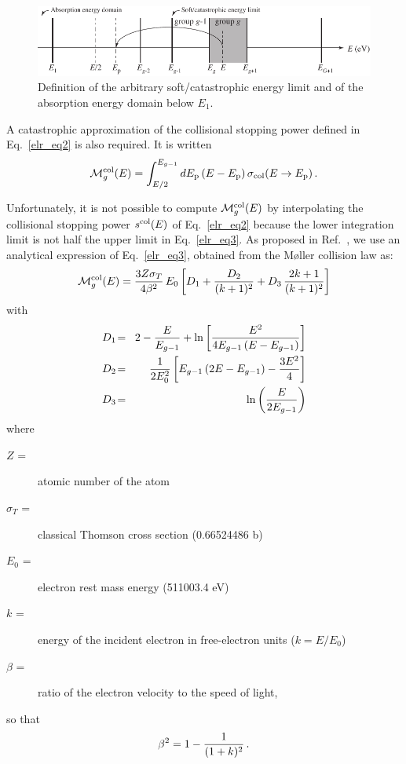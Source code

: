 \begin{figure}[h!]
\centering
\includegraphics[keepaspectratio, width=5.0in, angle=0]{figs/electr1ack}
\caption[Description of the multigroup discretization] {Definition of the
arbitrary soft/catastrophic energy limit and of the absorption energy domain
below $E_1$.}
\label{electr-fig1}
\end{figure}

A catastrophic approximation of the collisional stopping power defined
in Eq.~\ref{elr_eq2} is also required. It is written
  \begin{equation}
     {\cal M}^{\rm col}_g(E)=\int_{E/2}^{E_{g-1}} dE_{\rm p} \,
     (E - E_{\rm p}) \, \sigma_{\rm col}(E\rightarrow E_{\rm p}) \, .
  \label{elr_eq3}
  \end{equation}

Unfortunately, it is not possible to compute ${\cal M}^{\rm col}_g(E)$ by
interpolating the collisional stopping power $s^{\rm col}(E)$ of
Eq.~\ref{elr_eq2} because the lower integration limit is not half the upper
limit in Eq.~\ref{elr_eq3}. As proposed in Ref.~\cite{CEPXS}, we use an
analytical expression of Eq.~\ref{elr_eq3}, obtained from the M\o{}ller
collision law as:
  \begin{equation}
    {\cal M}^{\rm col}_g(E) = {3Z\sigma_T \over 4\beta^2}\, E_0
    \left[ D_1 + {D_2 \over (k+1)^2} + D_3 \, {2k+1 \over (k+1)^2} \right]
  \label{elr_eq4}
  \end{equation}
\noindent with
\vspace{-0.6cm}
  \begin{eqnarray}
  D_1\negthinspace &=& \negthinspace
  2-{E\over E_{g-1}}+\ln\left[{E^2\over 4E_{g-1}\left(E-E_{g-1}\right)}
  \right] \\
  D_2\negthinspace &=& {1\over 2E_0^2}\left[E_{g-1}\left(2E-E_{g-1}\right)
  - {3E^2\over 4}\right] \\
  D_3\negthinspace &=& \negthinspace \ln\left({E\over 2E_{g-1}}\right)
  \end{eqnarray}
\noindent where
\begin{description}
\item [$Z$ =] atomic number of the atom
\item [$\sigma_T$ =] classical Thomson cross section (0.66524486 b)
\item [$E_0$ =] electron rest mass energy (511003.4 eV)
\item [$k$ =] energy of the incident electron in free-electron units ($k=E/E_0$)
\item [$\beta$ =] ratio of the electron velocity to the speed of light,
\end{description}
\noindent so that
  \begin{equation}
    \beta^2=1-{1\over(1+k)^2} \, .
  \end{equation}

